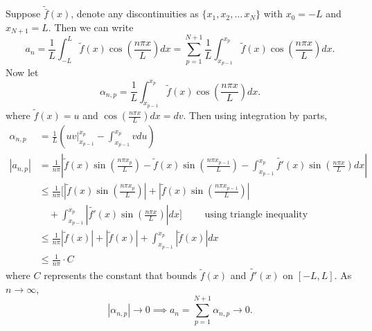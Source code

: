 \documentclass[class=article,crop=false]{standalone}
\begin{document}
\begin{prf}
	Suppose $\tilde{\bar{f}} (x)$, denote any discontinuities as $\{x_1,x_2,\ldots\,x_N\} $ with $x_0=-L$ and $x_{N+1} = L$. Then we can write
	 \[
		 a_n = \frac{1}{L} \int_{-L}^{L} \tilde{ f } (x) \cos \left( \frac{ n\pi x}{ L } \right) dx = \sum_{ p=1}^{ N+1} \frac{1}{L} \int_{ x_{p-1}}^{ x_{p}} \tilde{ f } (x) \cos \left( \frac{ n\pi x}{ L } \right) dx
	 .\]
		 Now let 
		 \[
			 \alpha_{n,p} = \frac{1}{L} \int_{ x_{p-1}}^{ x_{p}} \tilde{ f } (x) \cos \left( \frac{ n\pi x}{ L } \right) dx  
		 .\] 
		 where $\tilde{ f } (x) = u$ and $\cos \left( \frac{ n\pi x}{ L } \right) dx = dv$. Then using integration by parts,
		 \begin{align*}
			 \alpha_{n,p} &= \frac{1}{L} \left( uv \big|_{x_{p-1}}^{x_p} - \int_{ x_{p-1}}^{ x_p} v du  \right)  \\
				  |a_{n,p}|    &= \frac{1}{n\pi} \left| \tilde{ f } (x) \sin \left( \frac{ n\pi x_p}{ L} \right) -\tilde{ f } (x)\sin \left( \frac{ n\pi x_{p-1}}{ L} \right) -\int_{ x_{p-1}}^{ x_p} \tilde{f'}(x)\sin \left( \frac{ n\pi x}{ L} \right) dx   \right|  \\
				      &\leq \frac{1}{n\pi} \bigg[ \left| \tilde{ f } (x) \sin \left( \frac{ n\pi x_p}{ L} \right)  \right| +\left| \tilde{ f } (x) \sin \left( \frac{ n\pi x_{p-1}}{ L} \right)  \right| \\
				      & \quad + \int_{x_{p-1}}^{x_p} \left| \tilde{f'}(x) \sin \left( \frac{ n\pi x}{ L} \right)   \right| dx  \bigg]  \text{$\qquad $ using triangle inequality } \\
			 &\leq \frac{1}{n\pi} \left| \tilde{ f } (x) \right| + \left|\tilde{ f } (x)\right| + \int_{ x_{p-1}}^{ x_p} |\tilde{ f } (x)| dx  \\
			 &\leq \frac{1}{n\pi} \cdot C
		\end{align*}
		 where $C$ represents the constant that bounds  $\tilde{f}(x) $ and $\tilde{f'}(x) $ on $[-L,L]$. As $n \to \infty$,
		 \[
|\alpha_{n,p}| \to 0 \implies a_n=\sum_{ p=1}^{ N+1} \alpha_{n,p} \to 0 
.\] 
\end{prf}
\end{document}
